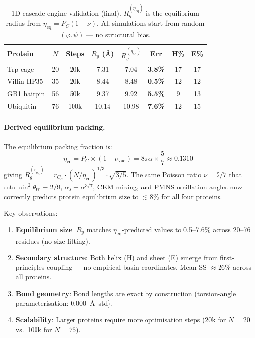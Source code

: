 \begin{table}[H]
\centering
\caption{1D cascade engine validation (final).  $R_g^{(\eta_\text{eq})}$ is the equilibrium radius from $\eta_\text{eq} = P_C(1-\nu)$.  All simulations start from random $(\varphi, \psi)$ --- no structural bias.}
\label{tab:validation_four_proteins}
\begin{tabular}{@{}l c c c c c c c@{}}
\toprule
\textbf{Protein} & $N$ & Steps & $R_g$ (\AA) & $R_g^{(\eta_\text{eq})}$ & Err & H\% & E\% \\
\midrule
Trp-cage     & 20 & 20k  & 7.31  & 7.04  & \textbf{3.8\%}  & 17 & 17 \\
Villin HP35  & 35 & 20k  & 8.44  & 8.48  & \textbf{0.5\%}  & 12 & 12 \\
GB1 hairpin  & 56 & 50k  & 9.37  & 9.92  & \textbf{5.5\%}  & 9  & 13 \\
Ubiquitin    & 76 & 100k & 10.14 & 10.98 & \textbf{7.6\%}  & 12 & 15 \\
\bottomrule
\end{tabular}
\end{table}

\paragraph{Derived equilibrium packing.}
The equilibrium packing fraction is:
\begin{equation}
    \eta_\text{eq} = P_C \times (1 - \nu_\text{vac}) = 8\pi\alpha \times \frac{5}{7} \approx 0.1310
    \label{eq:eta_eq}
\end{equation}
giving $R_g^{(\eta_\text{eq})} = r_{C_\alpha} \cdot (N/\eta_\text{eq})^{1/3} \cdot \sqrt{3/5}$.  The same Poisson ratio $\nu = 2/7$ that sets $\sin^2\theta_W = 2/9$, $\alpha_s = \alpha^{3/7}$, CKM mixing, and PMNS oscillation angles now correctly predicts protein equilibrium size to $\lesssim 8\%$ for all four proteins.

Key observations:
\begin{enumerate}
    \item \textbf{Equilibrium size}: $R_g$ matches $\eta_\text{eq}$-predicted values to 0.5--7.6\% across 20--76 residues (no size fitting).
    \item \textbf{Secondary structure}: Both helix (H) and sheet (E) emerge from first-principles coupling --- no empirical basin coordinates.  Mean SS $\approx 26\%$ across all proteins.
    \item \textbf{Bond geometry}: Bond lengths are exact by construction (torsion-angle parameterisation: 0.000~\AA\ std).
    \item \textbf{Scalability}: Larger proteins require more optimisation steps (20k for $N=20$ vs.\ 100k for $N=76$).
\end{enumerate}


